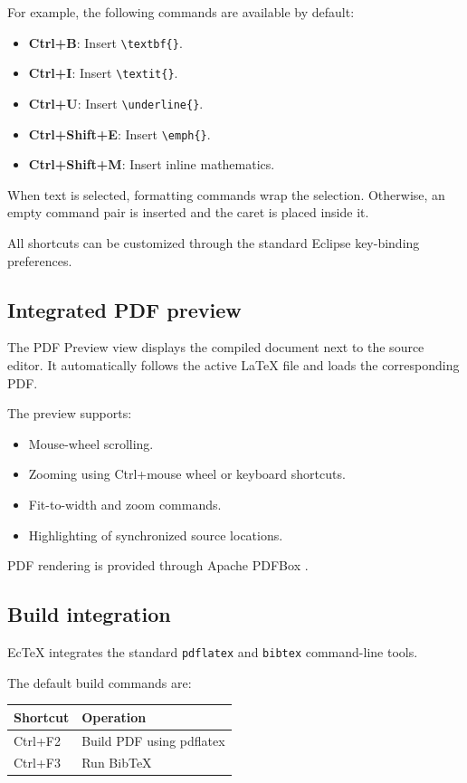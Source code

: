 \documentclass[11pt,a4paper]{article}
\begin{document}
For example, the following commands are available by
default:

\begin{itemize}[noitemsep]
    \item \textbf{Ctrl+B}: Insert \verb|\textbf{}|.
    \item \textbf{Ctrl+I}: Insert \verb|\textit{}|.
    \item \textbf{Ctrl+U}: Insert \verb|\underline{}|.
    \item \textbf{Ctrl+Shift+E}: Insert \verb|\emph{}|.
    \item \textbf{Ctrl+Shift+M}: Insert inline mathematics.
\end{itemize}

When text is selected, formatting commands wrap the
selection. Otherwise, an empty command pair is inserted
and the caret is placed inside it.

All shortcuts can be customized through the standard
Eclipse key-binding preferences.

\subsection{Integrated PDF preview}

The PDF Preview view displays the compiled document
next to the source editor. It automatically follows the
active LaTeX file and loads the corresponding PDF.

The preview supports:
\begin{itemize}[noitemsep]
    \item Mouse-wheel scrolling.
    \item Zooming using Ctrl+mouse wheel or keyboard
    shortcuts.
    \item Fit-to-width and zoom commands.
    \item Highlighting of synchronized source locations.
\end{itemize}

PDF rendering is provided through Apache PDFBox
\cite{pdfbox}.

\subsection{Build integration}

EcTeX integrates the standard \texttt{pdflatex} and
\texttt{bibtex} command-line tools.

The default build commands are:

\begin{center}
\begin{tabular}{ll}
\toprule
\textbf{Shortcut} & \textbf{Operation} \\
\midrule
Ctrl+F2 & Build PDF using pdflatex \\
Ctrl+F3 & Run BibTeX \\
\bottomrule
\end{tabular}
\end{center}
\end{document}
